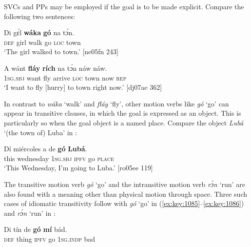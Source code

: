 \z

SVCs and PPs may be employed if the goal is to be made explicit. Compare the following two sentences:


\ea%
    \label{ex:key:1082}
    \gll Di  gɛ́l    \textbf{wáka}  \textbf{gó}  na  tɔ́n.\\
\textsc{def}  girl    walk  go  \textsc{loc}  town\\

\glt ‘The girl walked to town.’ [ne05fn 243]
\z


\ea%
    \label{ex:key:1083}
    \gll A    wánt  \textbf{fláy}  \textbf{rích}    na  tɔ́n   náw    náw.\\
\textsc{1sg.sbj}  want  fly  arrive  \textsc{loc}  town  now    \textsc{rep}\\

\glt ‘I want to fly [hurry] to town right now.’ [dj07ae 362]
\z

In contrast to \textit{wáka} ‘walk’ and \textit{fláy} ‘fly’, other motion verbs like \textit{gó} ‘go’ can appear in transitive clauses, in which the goal is expressed as an object. This is particularly so when the goal object is a named place. Compare the object \textit{Lubá} ‘(the town of) Luba’ in :


\ea%
    \label{ex:key:1084}
    \gll Dí  miércoles  a      de  \textbf{gó}  \textbf{Lubá}.\\
this  wednesday  \textsc{1sg.sbj}    \textsc{ipfv}  go  \textsc{place}\\

\glt ‘This Wednesday, I’m going to Luba.’ [ro05ee 119]
\z

The transitive motion verb \textit{gó} ‘go’ and the intransitive motion verb \textit{rɔ́n} ‘run’ are also found with a meaning other than physical motion through space. Three such cases of idiomatic transitivity follow with \textit{gó} ‘go’ in (\ref{ex:key:1085}–\ref{ex:key:1086}) and \textit{rɔ́n} ‘run’ in :


\ea%
    \label{ex:key:1085}
    \gll Di  tín    de  \textbf{gó}  \textbf{mí}    bád.\\
\textsc{def}  thing  \textsc{ipfv}  go  \textsc{1sg.indp}  bad\\

